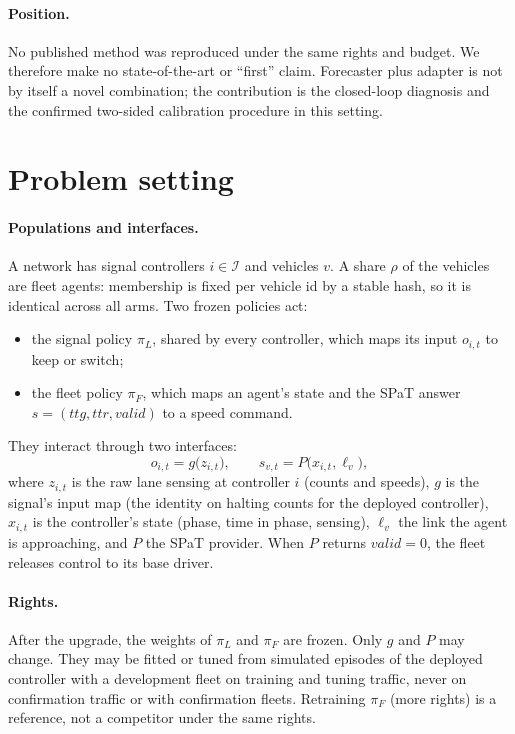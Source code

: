 \documentclass[11pt]{article}
\begin{document}
\paragraph{Position.} No published method was reproduced under the same rights and budget. We therefore make no state-of-the-art or
``first'' claim. Forecaster plus adapter is not by itself a novel combination; the contribution is the closed-loop diagnosis and the
confirmed two-sided calibration procedure in this setting.

\section{Problem setting}\label{sec:setting}
\paragraph{Populations and interfaces.} A network has signal controllers $i\in\mathcal I$ and vehicles $v$. A share $\rho$ of the vehicles
are fleet agents: membership is fixed per vehicle id by a stable hash, so it is identical across all arms. Two frozen policies act:
\begin{itemize}\setlength\itemsep{0pt}
\item the signal policy $\pi_L$, shared by every controller, which maps its input $o_{i,t}$ to keep or switch;
\item the fleet policy $\pi_F$, which maps an agent's state and the SPaT answer $s=(\mathit{ttg},\mathit{ttr},\mathit{valid})$ to a speed
command.
\end{itemize}
They interact through two interfaces:
\begin{equation}
o_{i,t} = g\big(z_{i,t}\big), \qquad s_{v,t} = P\big(x_{i,t}, \ell_v\big),
\end{equation}
where $z_{i,t}$ is the raw lane sensing at controller $i$ (counts and speeds), $g$ is the signal's input map (the identity on halting
counts for the deployed controller), $x_{i,t}$ is the controller's state (phase, time in phase, sensing), $\ell_v$ the link the agent is
approaching, and $P$ the SPaT provider. When $P$ returns $\mathit{valid}=0$, the fleet releases control to its base driver.
\paragraph{Rights.} After the upgrade, the weights of $\pi_L$ and $\pi_F$ are frozen. Only $g$ and $P$ may change. They may be fitted or
tuned from simulated episodes of the deployed controller with a development fleet on training and tuning traffic, never on confirmation
traffic or with confirmation fleets. Retraining $\pi_F$ (more rights) is a reference, not a competitor under the same rights.
\end{document}
